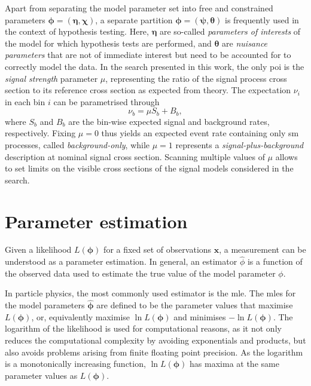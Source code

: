 Apart from separating the model parameter set into free and constrained parameters $\boldsymbol{\phi} = (\boldsymbol{\eta},\boldsymbol{\chi})$, a separate partition $\boldsymbol{\phi} = (\boldsymbol{\psi},\boldsymbol{\theta})$ is frequently used in the context of hypothesis testing. Here, $\boldsymbol{\eta}$ are so-called \textit{parameters of interests} of the model for which hypothesis tests are performed, and $\boldsymbol{\theta}$ are \textit{nuisance parameters} that are not of immediate interest but need to be accounted for to correctly model the data. In the search presented in this work, the only \gls{poi} is the \textit{signal strength} parameter $\mu$, representing the ratio of the signal process cross section to its reference cross section as expected from theory. The expectation $\nu_i$ in each bin $i$ can be parametrised through
\begin{equation}
	\nu_b = \mu S_b + B_b,
\end{equation}
where $S_b$ and $B_b$ are the bin-wise expected signal and background rates, respectively. Fixing $\mu = 0$ thus yields an expected event rate containing only \gls{sm} processes, called \textit{background-only}, while $\mu = 1$ represents a \textit{signal-plus-background} description at nominal signal cross section. Scanning multiple values of $\mu$ allows to set limits on the visible cross sections of the signal models considered in the search. 
  
\section{Parameter estimation}

Given a likelihood $L(\boldsymbol{\phi})$ for a fixed set of observations $\boldsymbol{x}$, a measurement can be understood as a parameter estimation. In general, an estimator $\hat{\phi}$ is a function of the observed data used to estimate the true value of the model parameter $\phi$.

In particle physics, the most commonly used estimator is the \gls{mle}. The \glspl{mle} for the model parameters $\boldsymbol{\hat{\phi}}$ are defined to be the parameter values that maximise $L(\boldsymbol{\phi})$, or, equivalently maximise $\ln{L(\boldsymbol{\phi})}$ and minimises $-\ln{L(\boldsymbol{\phi})}$. The logarithm of the likelihood is used for computational reasons, as it not only reduces the computational complexity by avoiding exponentials and products, but also avoids problems arising from finite floating point precision. As the logarithm is a monotonically increasing function, $\ln{L(\boldsymbol{\phi})}$ has maxima at the same parameter values as ${L(\boldsymbol{\phi})}$.

